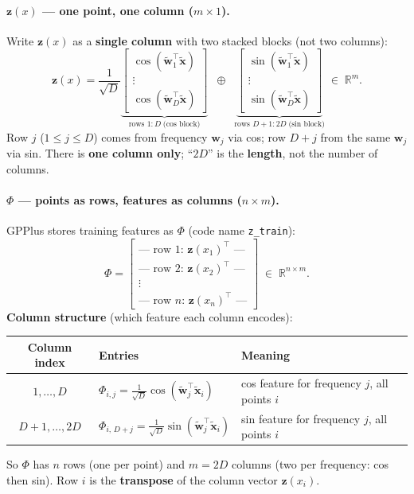 \documentclass[11pt]{article}
\newcommand{\Ph}{\Phi}
\begin{document}
\paragraph{$\mathbf z(x)$ --- one point, one column ($m \times 1$).}
Write $\mathbf z(x)$ as a \textbf{single column} with two stacked blocks (not two columns):
\[
  \mathbf z(x)
  = \frac{1}{\sqrt{D}}
  \underbrace{\begin{bmatrix}
    \cos(\tilde{\mathbf w}_1^{\top}\tilde{\mathbf x}) \\
    \vdots \\
    \cos(\tilde{\mathbf w}_D^{\top}\tilde{\mathbf x})
  \end{bmatrix}}_{\text{rows } 1{:}D \;\text{(cos block)}}
  \;\;\oplus\;\;
  \underbrace{\begin{bmatrix}
    \sin(\tilde{\mathbf w}_1^{\top}\tilde{\mathbf x}) \\
    \vdots \\
    \sin(\tilde{\mathbf w}_D^{\top}\tilde{\mathbf x})
  \end{bmatrix}}_{\text{rows } D{+}1{:}2D \;\text{(sin block)}}
  \;\in\; \mathbb{R}^{m}.
\]
Row $j$ ($1\le j\le D$) comes from frequency $\mathbf w_j$ via cos; row $D+j$ from the same $\mathbf w_j$ via sin.
There is \textbf{one column only}; ``$2D$'' is the \textbf{length}, not the number of columns.

\paragraph{$\Ph$ --- points as \textbf{rows}, features as \textbf{columns} ($n \times m$).}
GPPlus stores training features as $\Ph$ (code name \texttt{z\_train}):
\[
  \Ph =
  \begin{bmatrix}
    \text{--- row 1: } \mathbf z(x_1)^{\top} \text{ ---} \\[2pt]
    \text{--- row 2: } \mathbf z(x_2)^{\top} \text{ ---} \\
    \vdots \\
    \text{--- row } n \text{: } \mathbf z(x_n)^{\top} \text{ ---}
  \end{bmatrix}
  \;\in\; \mathbb{R}^{n \times m}.
\]
\textbf{Column structure} (which feature each column encodes):
\begin{center}
\renewcommand{\arraystretch}{1.25}
\begin{tabular}{@{}cll@{}}
\toprule
\textbf{Column index} & \textbf{Entries} & \textbf{Meaning} \\
\midrule
$1, \ldots, D$ &
$\Ph_{i,j} = \frac{1}{\sqrt{D}}\cos(\tilde{\mathbf w}_j^{\top}\tilde{\mathbf x}_i)$ &
cos feature for frequency $j$, all points $i$ \\
$D{+}1, \ldots, 2D$ &
$\Ph_{i,\,D+j} = \frac{1}{\sqrt{D}}\sin(\tilde{\mathbf w}_j^{\top}\tilde{\mathbf x}_i)$ &
sin feature for frequency $j$, all points $i$ \\
\bottomrule
\end{tabular}
\end{center}
So $\Ph$ has $n$ rows (one per point) and $m=2D$ columns (two per frequency: cos then sin).
Row $i$ is the \textbf{transpose} of the column vector $\mathbf z(x_i)$.
\end{document}
